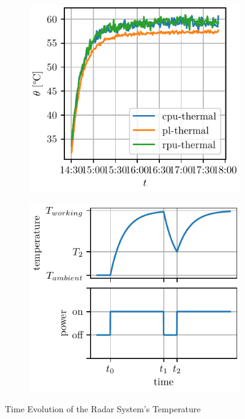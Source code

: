 \begin{figure}
    \begin{subfigure}[t]{0.45\textwidth}
        \centering
        \includegraphics[width=\textwidth]{../figures/actual_temperature.pdf}
        \label{fig:act_temp}
    \end{subfigure}
    \begin{subfigure}[t]{0.45\textwidth}
        \centering
        \includegraphics[width=\textwidth]{../figures/expected_temperature.pdf}
        \label{fig:exp_temp}
    \end{subfigure}
    \caption{Time Evolution of the Radar System's Temperature}
\end{figure}

